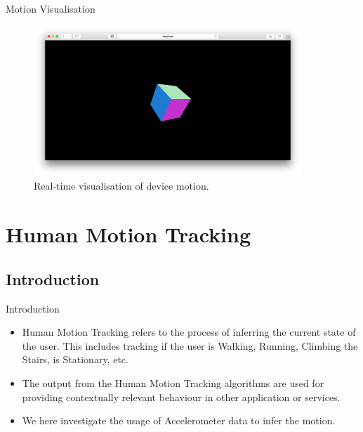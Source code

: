 \documentclass{beamer}
\begin{document}
\begin{frame}{Motion Visualisation}
    \begin{figure}[h]
    \centering
    \includegraphics[width=0.9\textwidth]{ahrs_js.png}
    \caption{Real-time visualisation of device motion.}
    \end{figure}
\end{frame}
\section{Human Motion Tracking}
\subsection{Introduction}
\begin{frame}{Introduction}
  \begin{itemize}
  \item {
    Human Motion Tracking refers to the process of inferring the current state of the user.
    This includes tracking if the user is Walking, Running, Climbing the Stairs, is Stationary, etc.
  }
  \item{
    The output from the Human Motion Tracking algorithms are used for providing contextually relevant behaviour in other application or services.
  }
  \item{
    We here investigate the usage of Accelerometer data to infer the motion.
  }
  \end{itemize}
\end{frame}
\end{document}
